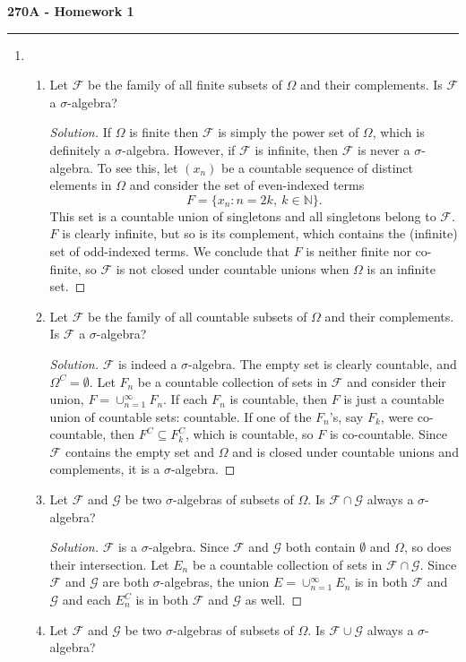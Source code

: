 \documentclass[11pt,letterpaper]{report}
\newcommand{\naturals}{\mathbb{N}}
\newcommand{\mcal}[1]{\mathcal{#1}}
\newenvironment{solution}
{\begin{proof}[Solution]}
{\end{proof}}
\begin{document}
\begin{center}
{\bf \Large 270A - Homework 1}
\vspace{0.2cm}
\hrule
\end{center}

\begin{enumerate}
	\item \begin{enumerate}
		\item Let $\mcal{F}$ be the family of all finite subsets of $\Omega$ and their complements. Is $\mcal{F}$ a $\sigma$-algebra?
		\begin{solution}
			If $\Omega$ is finite then $\mcal{F}$ is simply the power set of $\Omega$, which is definitely a $\sigma$-algebra. However, if $\mcal{F}$ is infinite, then $\mcal{F}$ is never a $\sigma$-algebra. To see this, let $(x_n)$ be a countable sequence of distinct elements in $\Omega$ and consider the set of even-indexed terms
			\[
				F = \{x_n: n = 2k,\ k\in \naturals\}.
			\]
			This set is a countable union of singletons and all singletons belong to $\mcal{F}$. $F$ is clearly infinite, but so is its complement, which contains the (infinite) set of odd-indexed terms. We conclude that $F$ is neither finite nor co-finite, so $\mcal{F}$ is not closed under countable unions when $\Omega$ is an infinite set.
		\end{solution}

		\item Let $\mcal{F}$ be the family of all countable subsets of $\Omega$ and their complements. Is $\mcal{F}$ a $\sigma$-algebra?
		\begin{solution}
			$\mcal{F}$ is indeed a $\sigma$-algebra. The empty set is clearly countable, and $\Omega^C = \emptyset$. Let $F_n$ be a countable collection of sets in $\mcal{F}$ and consider their union, $F = \cup_{n=1}^\infty F_n$. If each $F_n$ is countable, then $F$ is just a countable union of countable sets: countable. If one of the $F_n$'s, say $F_k$, were co-countable, then $F^C \subseteq F_k^C$, which is countable, so $F$ is co-countable. Since $\mcal{F}$ contains the empty set and $\Omega$ and is closed under countable unions and complements, it is a $\sigma$-algebra.
		\end{solution}

		\item Let $\mcal{F}$ and $\mcal{G}$ be two $\sigma$-algebras of subsets of $\Omega$. Is $\mcal{F}\cap \mcal{G}$ always a $\sigma$-algebra?
		\begin{solution}
			$\mcal{F}$ is a $\sigma$-algebra. Since $\mcal{F}$ and $\mcal{G}$ both contain $\emptyset$ and $\Omega$, so does their intersection. Let $E_n$ be a countable collection of sets in $\mcal{F}\cap \mcal{G}$. Since $\mcal{F}$ and $\mcal{G}$ are both $\sigma$-algebras, the union $E = \cup_{n=1}^\infty E_n$ is in both $\mcal{F}$ and $\mcal{G}$ and each $E_n^C$ is in both $\mcal{F}$ and $\mcal{G}$ as well.
		\end{solution}

		\item Let $\mcal{F}$ and $\mcal{G}$ be two $\sigma$-algebras of subsets of $\Omega$. Is $\mcal{F}\cup \mcal{G}$ always a $\sigma$-algebra?
	\end{enumerate}
\end{enumerate}
\end{document}
